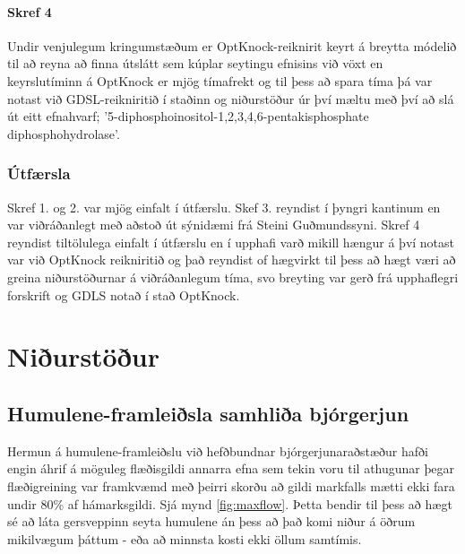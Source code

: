 \documentclass[11pt]{article}
\begin{document}
\begin{multicols}{2}
\paragraph{Skref 4}
Undir venjulegum kringumstæðum er OptKnock-reiknirit keyrt á breytta módelið til að reyna að finna útslátt sem kúplar seytingu efnisins við vöxt en keyrslutíminn á OptKnock er mjög tímafrekt og til þess að spara tíma þá var notast við GDSL\cite{lun2009large}-reikniritið í staðinn og niðurstöður úr því mæltu með því að slá út eitt efnahvarf; '5-diphosphoinositol-1,2,3,4,6-pentakisphosphate diphosphohydrolase'.

\subsubsection{Útfærsla}
Skref 1. og 2. var mjög einfalt í útfærslu. Skef 3. reyndist í þyngri kantinum en var viðráðanlegt með aðstoð út sýnidæmi frá Steini Guðmundssyni. Skref 4 reyndist tiltölulega einfalt í útfærslu en í upphafi varð mikill hængur á því notast var við OptKnock reikniritið og það reyndist of hægvirkt til þess að hægt væri að greina niðurstöðurnar á viðráðanlegum tíma, svo breyting var gerð frá upphaflegri forskrift og GDLS \cite{lun2009large} notað í stað OptKnock.

\section{Niðurstöður}
\subsection{Humulene-framleiðsla samhliða bjórgerjun}
Hermun á humulene-framleiðslu við hefðbundnar bjórgerjunaraðstæður hafði engin áhrif á möguleg flæðisgildi annarra efna sem tekin voru til athugunar þegar flæðigreining var framkvæmd með þeirri skorðu að gildi markfalls mætti ekki fara undir 80\% af hámarksgildi. Sjá mynd \ref{fig:maxflow}. Þetta bendir til þess að hægt sé að láta gersveppinn seyta humulene án þess að það komi niður á öðrum mikilvægum þáttum - eða að minnsta kosti ekki öllum samtímis.


\end{multicols}
\end{document}
